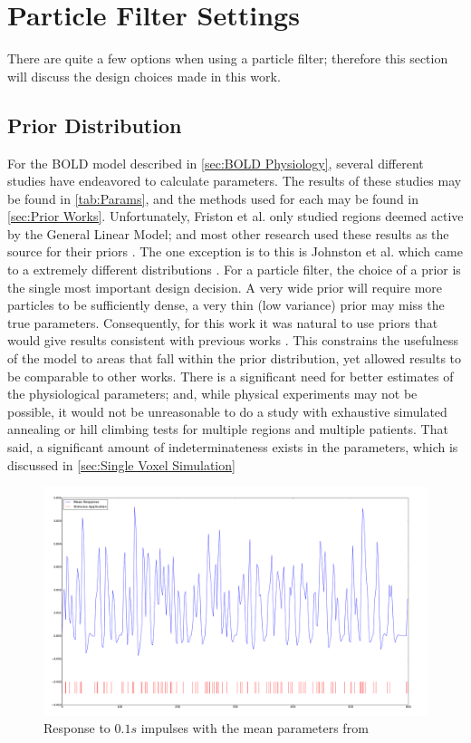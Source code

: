 \section{Particle Filter Settings}
There are quite a few options when using a particle filter; therefore this
section will discuss the design choices made in this work.

\subsection{Prior Distribution}
\label{sec:PriorDist}
For the BOLD model described in \autoref{sec:BOLD Physiology}, several
different studies have endeavored to calculate parameters. The results
of these studies may be found in \autoref{tab:Params}, and the methods
used for each may be found in \autoref{sec:Prior Works}. Unfortunately,
Friston et al. only studied regions deemed active by the General
Linear Model; and most other research used these results as
the source for their priors \cite{Friston2002}.
The one exception is to this is Johnston et al. which came to a extremely different
distributions \cite{Johnston2008}. For a particle filter, the choice of a prior is
the single most important design decision. A very wide prior will require
more particles to be sufficiently dense, a very thin (low variance) prior may miss
the true parameters. Consequently, for this work it was natural
to use priors that would give results consistent with previous works
\cite{Friston2002}. This constrains the usefulness of the model to
areas that fall within the prior distribution, yet allowed results
to be comparable to other works. There is a significant need for better
estimates of the physiological parameters; and, while physical experiments
may not be possible, it would not be unreasonable to do a study with
exhaustive simulated annealing or hill climbing tests for multiple
regions and multiple patients. That said, a significant amount of
indeterminateness exists in the parameters, which is discussed in
\autoref{sec:Single Voxel Simulation}

\begin{figure}
\centering
\includegraphics[trim=6cm 2cm 6cm 2cm,width=15cm]{images/mean_response}
\caption{Response to $0.1s$ impulses with the mean parameters from \cite{Friston2000}}
\label{fig:MeanResponseF}
\end{figure}

